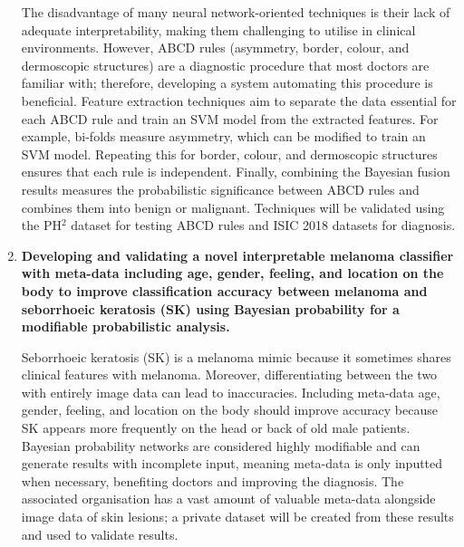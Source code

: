\begin{enumerate}
The disadvantage of many neural network-oriented techniques is their lack of adequate interpretability, making them challenging to utilise in clinical environments. However, ABCD rules (asymmetry, border, colour, and dermoscopic structures) are a diagnostic procedure that most doctors are familiar with; therefore, developing a system automating this procedure is beneficial. Feature extraction techniques aim to separate the data essential for each ABCD rule and train an SVM model from the extracted features. For example, bi-folds measure asymmetry, which can be modified to train an SVM model. Repeating this for border, colour, and dermoscopic structures ensures that each rule is independent. Finally, combining the Bayesian fusion results measures the probabilistic significance between ABCD rules and combines them into benign or malignant. Techniques will be validated using the PH$^2$ dataset for testing ABCD rules and ISIC 2018 datasets for diagnosis.

\item \textbf{Developing and validating a novel interpretable melanoma classifier with meta-data including age, gender, feeling, and location on the body to improve classification accuracy between melanoma and seborrhoeic keratosis (SK) using Bayesian probability for a modifiable probabilistic analysis.}

Seborrhoeic keratosis (SK) is a melanoma mimic because it sometimes shares clinical features with melanoma. Moreover, differentiating between the two with entirely image data can lead to inaccuracies. Including meta-data age, gender, feeling, and location on the body should improve accuracy because SK appears more frequently on the head or back of old male patients. Bayesian probability networks are considered highly modifiable and can generate results with incomplete input, meaning meta-data is only inputted when necessary, benefiting doctors and improving the diagnosis. The associated organisation has a vast amount of valuable meta-data alongside image data of skin lesions; a private dataset will be created from these results and used to validate results.


\end{enumerate}
